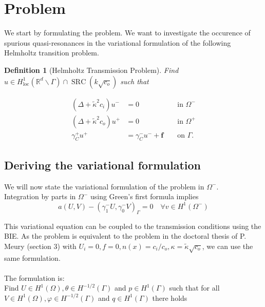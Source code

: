 \documentclass[10pt,journal,compsoc, onecolumn]{IEEEtran}
\newtheorem{theorem}{Theorem}[section]
\newtheorem{definition}[theorem]{Definition}
\begin{document}

\section{Problem }
We start by formulating the problem. We want to investigate the occurence of spurious quasi-resonances in the variational formulation of the following Helmholtz transition problem.

\begin{definition}[Helmholtz Transmission Problem]
Find \(u \in H_{\operatorname{loc}}^{1}\left(\mathbb{R}^{d} \backslash \Gamma\right) \cap \operatorname{SRC}\left(k \sqrt{c_{o}}\right)\) 
such that

\begin{align}
    \left(\Delta+\tilde\kappa^{2} c_{i}\right) u^{-} &=0 & & \text { in } \Omega^{-}  \nonumber
    \\\left(\Delta+\tilde\kappa^{2} c_{o}\right) u^{+} &=0 & & \text { in } \Omega^{+} \label{eq:helmholtz}
    \\ \gamma_{C}^{+} u^{+} &=\gamma_{C}^{-} u^{-}+\mathbf{f} & & \text { on } \Gamma. \nonumber
\end{align}

\end{definition}

\subsection{Deriving the variational formulation}
We will now state the variational formulation of the problem in $\Omega^-$. \\
Integration by parts in $\Omega^-$ using Green's first formula implies 
$$
a(U, V) - \left(\gamma_{1}^{-} U, \gamma_{0}^{-} V\right)_{\Gamma}=0 \quad \forall v \in H^{1}\left(\Omega^{-}\right)
$$

This variational equation can be coupled to the transmission conditions using the BIE. 
As the problem is equivalent to the problem in the doctoral thesis of P. Meury (section 3) with $U_i = 0, f = 0, n(x) = c_i / c_o, 
\kappa = \tilde \kappa \sqrt{c_o}$, 
we can use the same formulation.\\
\\
The formulation is: \\ 
Find \(U \in H^{1}(\Omega), \theta \in H^{-1 / 2}(\Gamma)\) and \(p \in H^{1}(\Gamma)\) such that for all \(V \in H^{1}(\Omega), \varphi \in H^{-1 / 2}(\Gamma)\)
and \(q \in H^{1}(\Gamma)\) there holds
\end{document}
